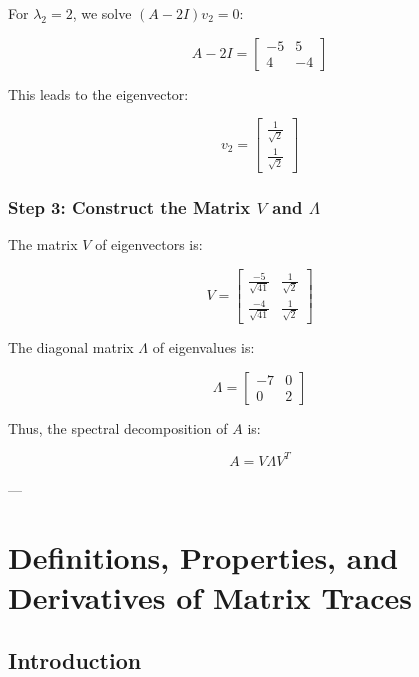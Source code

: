 \documentclass{article}
\begin{document}
For \( \lambda_2 = 2 \), we solve \( (A - 2I) v_2 = 0 \):

\[
A - 2I = \begin{bmatrix}
    -5 & 5 \\
    4 & -4
\end{bmatrix}
\]

This leads to the eigenvector:

\[
v_2 = \begin{bmatrix}
    \frac{1}{\sqrt{2}} \\
    \frac{1}{\sqrt{2}}
\end{bmatrix}
\]

\subsubsection*{Step 3: Construct the Matrix \( V \) and \( \Lambda \)}

The matrix \( V \) of eigenvectors is:

\[
V = \begin{bmatrix}
    \frac{-5}{\sqrt{41}} & \frac{1}{\sqrt{2}} \\
    \frac{-4}{\sqrt{41}} & \frac{1}{\sqrt{2}}
\end{bmatrix}
\]

The diagonal matrix \( \Lambda \) of eigenvalues is:

\[
\Lambda = \begin{bmatrix}
    -7 & 0 \\
    0 & 2
\end{bmatrix}
\]

Thus, the spectral decomposition of \( A \) is:

\[
A = V \Lambda V^T
\]

---

\section*{Definitions, Properties, and Derivatives of Matrix Traces}
\subsection*{Introduction}
\end{document}
